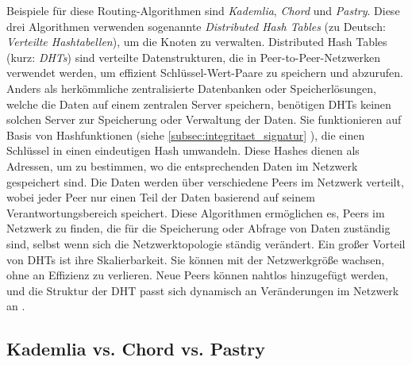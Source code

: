 Beispiele für diese Routing-Algorithmen sind \textit{Kademlia}, \textit{Chord} und \textit{Pastry}. Diese drei Algorithmen verwenden sogenannte \textit{Distributed Hash Tables} (zu Deutsch: \textit{Verteilte Hashtabellen}), um die Knoten zu verwalten. Distributed Hash Tables (kurz: \textit{DHTs}) sind verteilte Datenstrukturen, die in Peer-to-Peer-Netzwerken verwendet werden, um effizient Schlüssel-Wert-Paare zu speichern und abzurufen. Anders als herkömmliche zentralisierte Datenbanken oder Speicherlösungen, welche die Daten auf einem zentralen Server speichern, benötigen DHTs keinen solchen Server zur Speicherung oder Verwaltung der Daten. Sie funktionieren auf Basis von Hashfunktionen (siehe \ref{subsec:integritaet_signatur} \textit{}), die einen Schlüssel in einen eindeutigen Hash umwandeln. Diese Hashes dienen als Adressen, um zu bestimmen, wo die entsprechenden Daten im Netzwerk gespeichert sind. Die Daten werden über verschiedene Peers im Netzwerk verteilt, wobei jeder Peer nur einen Teil der Daten basierend auf seinem Verantwortungsbereich speichert. Diese Algorithmen ermöglichen es, Peers im Netzwerk zu finden, die für die Speicherung oder Abfrage von Daten zuständig sind, selbst wenn sich die Netzwerktopologie ständig verändert. Ein großer Vorteil von DHTs ist ihre Skalierbarkeit. Sie können mit der Netzwerkgröße wachsen, ohne an Effizienz zu verlieren. Neue Peers können nahtlos hinzugefügt werden, und die Struktur der DHT passt sich dynamisch an Veränderungen im Netzwerk an \parencites{Stoica_Chord}{Rowstron_Pastry}{Maymounkov_Kademlia}[S. 43-46]{Balakrishnan_LookingUpDataInP2PSystems}.


\subsection{Kademlia vs. Chord vs. Pastry}
\label{subsec:kademlia_vs_chord_vs_pastry}

